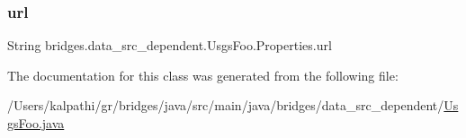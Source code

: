 \mbox{\label{classbridges_1_1data__src__dependent_1_1_usgs_foo_1_1_properties_a42e5d1f2c28c6708921861ed95aa5e5f}} 
\subsubsection{\texorpdfstring{url}{url}}
{\footnotesize\ttfamily String bridges.\+data\+\_\+src\+\_\+dependent.\+Usgs\+Foo.\+Properties.\+url}



The documentation for this class was generated from the following file\+:\begin{DoxyCompactItemize}
\item 
/\+Users/kalpathi/gr/bridges/java/src/main/java/bridges/data\+\_\+src\+\_\+dependent/\mbox{\hyperlink{_usgs_foo_8java}{Usgs\+Foo.\+java}}\end{DoxyCompactItemize}
